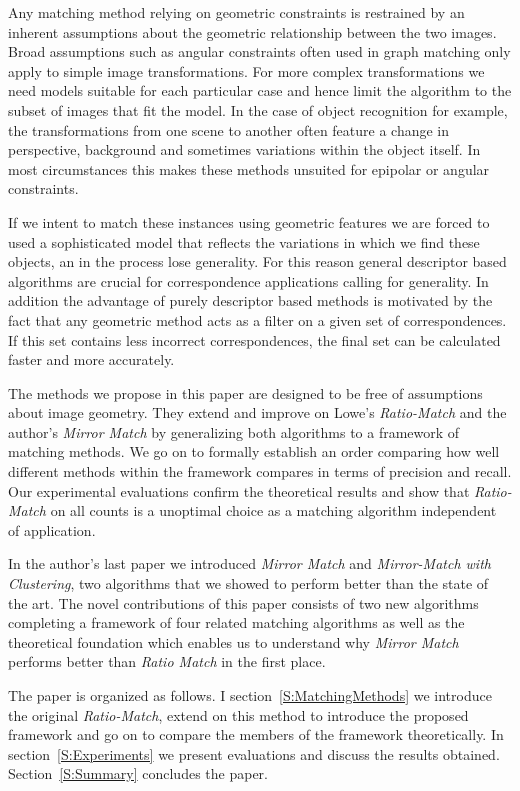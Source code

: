 \documentclass[journal]{IEEEtran}
\begin{document}
Any matching method relying on geometric constraints is restrained by an
inherent assumptions about the geometric relationship between the two 
images. Broad assumptions such as angular constraints often used in 
graph matching only apply to simple image transformations. For more 
complex transformations we need models suitable for each particular case 
and hence limit the algorithm to the subset of images that fit the 
model. In the case of object recognition for example, the 
transformations from one scene to another often feature a change in 
perspective, background and sometimes variations within the object 
itself. In most circumstances this makes these methods unsuited for 
epipolar or angular constraints.

If we intent to match these instances using geometric features we are 
forced to used a sophisticated model that reflects the variations in 
which we find these objects, an in the process lose generality. For this 
reason general descriptor based algorithms are crucial for 
correspondence applications calling for generality. In addition the 
advantage of purely descriptor based methods is motivated by the fact 
that any geometric method acts as a filter on a given set of 
correspondences.  If this set contains less incorrect correspondences, 
the final set can be calculated faster and more accurately.

The methods we propose in this paper are designed to be free of 
assumptions about image geometry. They extend and improve on Lowe's 
\emph{Ratio-Match} \cite{lowe2004sift} and the author's \emph{Mirror 
Match} \cite{arnfred2013mirror} by generalizing both algorithms to a 
framework of matching methods. We go on to formally establish an order 
comparing how well different methods within the framework compares in 
terms of precision and recall. Our experimental evaluations confirm the 
theoretical results and show that \emph{Ratio-Match} on all counts is a 
unoptimal choice as a matching algorithm independent of application. 

In the author's last paper we introduced \emph{Mirror Match} and 
\emph{Mirror-Match with Clustering}, two algorithms that we showed to 
perform better than the state of the art. The novel contributions of 
this paper consists of two new algorithms completing a framework of four 
related matching algorithms as well as the theoretical foundation which 
enables us to understand why \emph{Mirror Match} performs better than 
\emph{Ratio Match} in the first place.

The paper is organized as follows. I section~\ref{S:MatchingMethods} we 
introduce the original \emph{Ratio-Match}, extend on this method to 
introduce the proposed framework and go on to compare the members of the 
framework theoretically.  In section~\ref{S:Experiments} we present 
evaluations and discuss the results obtained.  Section~\ref{S:Summary} 
concludes the paper.
\end{document}
